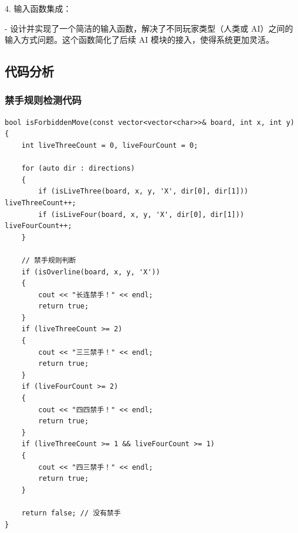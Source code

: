 4. 输入函数集成：

   - 设计并实现了一个简洁的输入函数，解决了不同玩家类型（人类或 AI）之间的输入方式问题。这个函数简化了后续 AI 模块的接入，使得系统更加灵活。

\subsection{代码分析} %

\subsubsection{禁手规则检测代码}
\begin{lstlisting}[caption={禁手规则判断核心代码}, label={code:forbiddenMove}]
bool isForbiddenMove(const vector<vector<char>>& board, int x, int y) 
{
    int liveThreeCount = 0, liveFourCount = 0;

    for (auto dir : directions) 
    {
        if (isLiveThree(board, x, y, 'X', dir[0], dir[1])) liveThreeCount++;
        if (isLiveFour(board, x, y, 'X', dir[0], dir[1])) liveFourCount++;
    }

    // 禁手规则判断
    if (isOverline(board, x, y, 'X')) 
    {
        cout << "长连禁手！" << endl;
        return true;
    }
    if (liveThreeCount >= 2) 
    {
        cout << "三三禁手！" << endl;
        return true;
    }
    if (liveFourCount >= 2) 
    {
        cout << "四四禁手！" << endl;
        return true;
    }
    if (liveThreeCount >= 1 && liveFourCount >= 1) 
    {
        cout << "四三禁手！" << endl;
        return true;
    }

    return false; // 没有禁手
}
\end{lstlisting}

